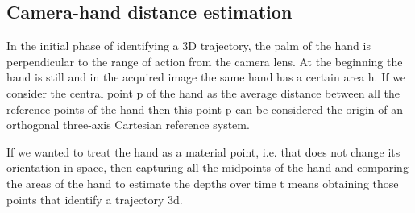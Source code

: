 \subsection{Camera-hand distance estimation}
\label{subsec:cam-hand}
%
%

In the initial phase of identifying a 3D trajectory, the palm of the hand is perpendicular to the range of action from the camera lens. At the beginning the hand is still and in the acquired image the same hand has a certain area h. If we consider the central point p of the hand as the average distance between all the reference points of the hand then this point p can be considered the origin of an orthogonal three-axis Cartesian reference system.

\noindent If we wanted to treat the hand as a material point, i.e. that does not change its orientation in space, then capturing all the midpoints of the hand and comparing the areas of the hand to estimate the depths over time t means obtaining those points that identify a trajectory 3d.

